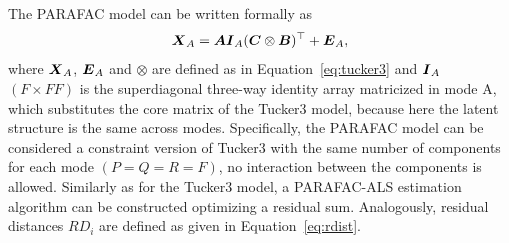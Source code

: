 \documentclass[article,shortnames, nojss]{jss}
\newcommand{\vv}[1]{\mbox{\boldmath$#1$}}
\begin{document}
The PARAFAC model can be written formally as
\begin{equation}
\label{parafac}
\vv{X}_A = \vv{AI}_A(\vv{C} \otimes \vv{B})^\top + \vv{E}_A,
\end{equation}
where $\vv{X}_A$, $\vv{E}_A$ and $\otimes$ are defined as in Equation~\ref{eq:tucker3} and $\vv{I}_A$ $(F \times F F)$ is the superdiagonal three-way identity array matricized in mode A,  which substitutes  the core matrix of the Tucker3 model, because here the latent structure is the same across modes. Specifically, the PARAFAC model can be considered a constraint version of Tucker3 with the same number of components for each mode $(P = Q = R = F)$, no interaction between
the components is allowed. Similarly as for the Tucker3 model, a PARAFAC-ALS estimation algorithm can be constructed optimizing a residual sum. Analogously, residual distances $RD_i$ are defined as given in Equation~\ref{eq:rdist}.
\end{document}
